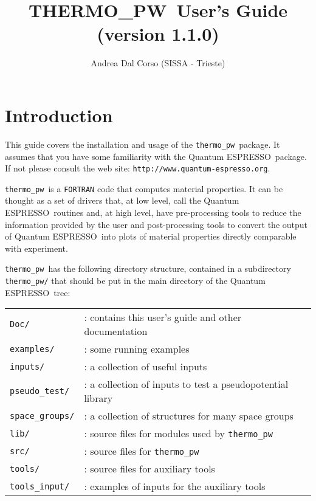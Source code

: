 \documentclass[12pt,a4paper]{article}
\def\version{1.1.0}
\def\qe{{\sc Quantum ESPRESSO}}
\def\tpw{{\sc THERMO\_PW}}
\def\thermo{\texttt{thermo\_pw}}
\begin{document}
 
\author{Andrea Dal Corso (SISSA - Trieste)}
\date{}


\title{
  \vskip 1cm
  {\color{red} \Huge \tpw\ User's Guide} \\
  \Large (version \version)
}

\maketitle

\tableofcontents

\newpage

\section{\color{coral}Introduction}

This guide covers the installation and usage of the \thermo\ package. 
It assumes that you have some familiarity with the \qe\ package. 
If not please consult the web site: \texttt{http://www.quantum-espresso.org}.

\thermo\ is a \texttt{FORTRAN} code that computes material properties.
It can be thought as a set of drivers that,
at low level, call the \qe\ routines and, at high level, have pre-processing
tools to reduce the information provided by the user and
post-processing tools to convert the output of \qe\ into plots of material 
properties directly comparable with experiment.

\thermo\ has the following directory structure, contained in a subdirectory 
\texttt{thermo\_pw/} that should be put in the main directory of the \qe\ tree:

\begin{tabular}{ll}
\texttt{Doc/}      & : contains this user's guide and other documentation\\
\texttt{examples/} & : some running examples \\
\texttt{inputs/}   & : a collection of useful inputs \\
\texttt{pseudo\_test/} & : a collection of inputs to test a pseudopotential library\\
\texttt{space\_groups/} & : a collection of structures for many space groups \\
\texttt{lib/}      & : source files for modules used by \thermo\ \\
\texttt{src/}      & : source files for \thermo\ \\
\texttt{tools/}    & : source files for auxiliary tools \\
\texttt{tools\_input/}  & : examples of inputs for the auxiliary tools \\
\end{tabular}\\
\end{document}
